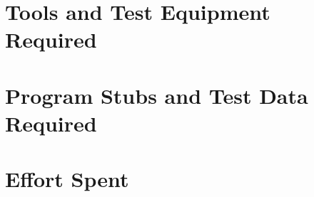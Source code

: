 \documentclass[11pt,a4paper]{report}
\begin{document}
\chapter{Tools and Test Equipment Required}
\chapter{Program Stubs and Test Data Required}
\chapter{Effort Spent}
\end{document}
